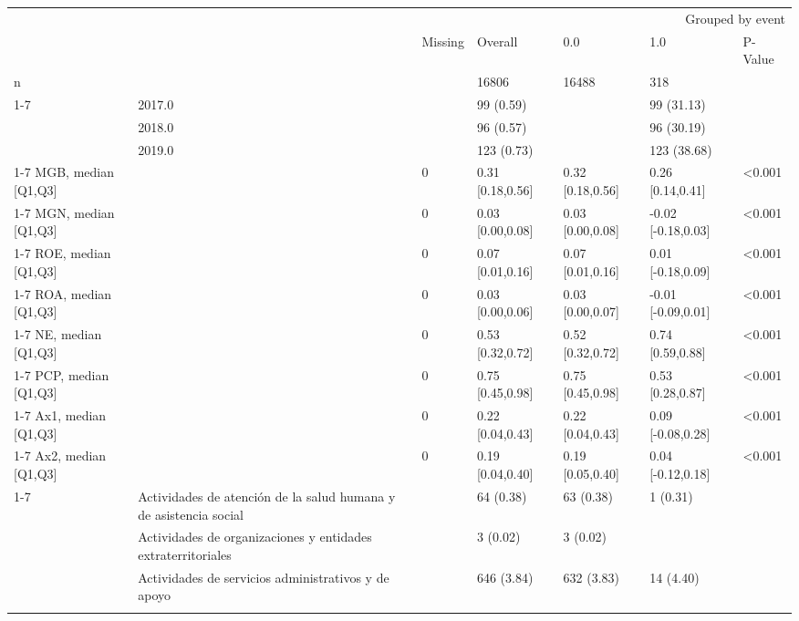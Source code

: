 \begin{tabular}{lllllll}
\toprule
 &  & \multicolumn{5}{r}{Grouped by event} \\
 &  & Missing & Overall & 0.0 & 1.0 & P-Value \\
\midrule
n &  &  & 16806 & 16488 & 318 &  \\
\cline{1-7}
\multirow[t]{4}{*}{time-event, n (%
 & 2017.0 &  & 99 (0.59) &  & 99 (31.13) &  \\
 & 2018.0 &  & 96 (0.57) &  & 96 (30.19) &  \\
 & 2019.0 &  & 123 (0.73) &  & 123 (38.68) &  \\
\cline{1-7}
MGB, median [Q1,Q3] &  & 0 & 0.31 [0.18,0.56] & 0.32 [0.18,0.56] & 0.26 [0.14,0.41] & <0.001 \\
\cline{1-7}
MGN, median [Q1,Q3] &  & 0 & 0.03 [0.00,0.08] & 0.03 [0.00,0.08] & -0.02 [-0.18,0.03] & <0.001 \\
\cline{1-7}
ROE, median [Q1,Q3] &  & 0 & 0.07 [0.01,0.16] & 0.07 [0.01,0.16] & 0.01 [-0.18,0.09] & <0.001 \\
\cline{1-7}
ROA, median [Q1,Q3] &  & 0 & 0.03 [0.00,0.06] & 0.03 [0.00,0.07] & -0.01 [-0.09,0.01] & <0.001 \\
\cline{1-7}
NE, median [Q1,Q3] &  & 0 & 0.53 [0.32,0.72] & 0.52 [0.32,0.72] & 0.74 [0.59,0.88] & <0.001 \\
\cline{1-7}
PCP, median [Q1,Q3] &  & 0 & 0.75 [0.45,0.98] & 0.75 [0.45,0.98] & 0.53 [0.28,0.87] & <0.001 \\
\cline{1-7}
Ax1, median [Q1,Q3] &  & 0 & 0.22 [0.04,0.43] & 0.22 [0.04,0.43] & 0.09 [-0.08,0.28] & <0.001 \\
\cline{1-7}
Ax2, median [Q1,Q3] &  & 0 & 0.19 [0.04,0.40] & 0.19 [0.05,0.40] & 0.04 [-0.12,0.18] & <0.001 \\
\cline{1-7}
\multirow[t]{20}{*}{Clasificación Industrial Internacional Uniforme Versión 4 A.C, n (%
 & Actividades de atención de la salud humana y de asistencia social &  & 64 (0.38) & 63 (0.38) & 1 (0.31) &  \\
 & Actividades de organizaciones y entidades extraterritoriales &  & 3 (0.02) & 3 (0.02) &  &  \\
 & Actividades de servicios administrativos y de apoyo &  & 646 (3.84) & 632 (3.83) & 14 (4.40) &  \\
}}
\end{tabular}
